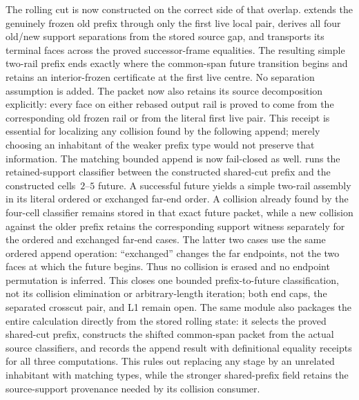 \documentclass[11pt]{article}
\theoremstyle{definition}
\begin{document}
The rolling cut is now constructed on the correct side of that overlap.
extends the genuinely frozen old prefix through only the first live local
pair, derives all four old/new support separations from the stored source gap,
and transports its terminal faces across the proved successor-frame
equalities.  The resulting simple two-rail prefix ends exactly where the
common-span future transition begins and retains an interior-frozen
certificate at the first live centre.  No separation assumption is added.
The packet now also retains its source decomposition explicitly: every face
on either rebased output rail is proved to come from the corresponding old
frozen rail or from the literal first live pair.  This receipt is essential
for localizing any collision found by the following append; merely choosing
an inhabitant of the weaker prefix type would not preserve that information.
The matching bounded append is now fail-closed as well.
runs the retained-support classifier between the constructed shared-cut prefix
and the constructed cells~$2$--$5$ future.  A successful future yields a
simple two-rail assembly in its literal ordered or exchanged far-end order.
A collision already found by the four-cell classifier remains stored in that
exact future packet, while a new collision against the older prefix retains
the corresponding support witness separately for the ordered and exchanged
far-end cases.  The latter two cases use the same ordered append operation:
``exchanged'' changes the far endpoints, not the two faces at which the future
begins.  Thus no collision is erased and no endpoint permutation is inferred.
This closes one bounded prefix-to-future classification, not its collision
elimination or arbitrary-length iteration; both end caps, the separated
crosscut pair, and L1 remain open.
The same module also packages the entire calculation directly from the stored
rolling state: it selects the proved shared-cut prefix, constructs the shifted
common-span packet from the actual source classifiers, and records the append
result with definitional equality receipts for all three computations.  This
rules out replacing any stage by an unrelated inhabitant with matching types,
while the stronger shared-prefix field retains the source-support provenance
needed by its collision consumer.
\end{document}

